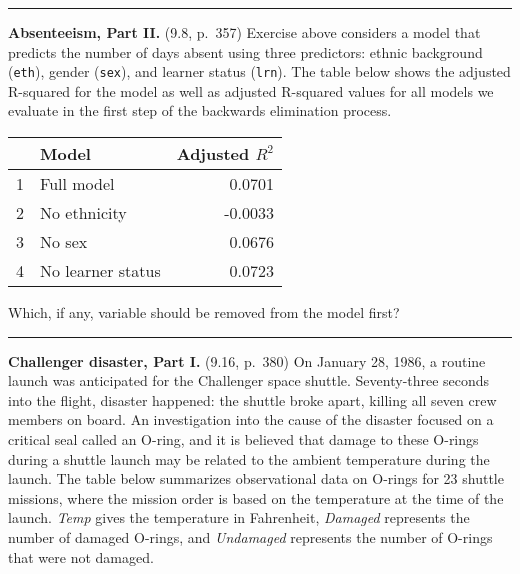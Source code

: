 \documentclass[
]{article}
\begin{document}
\begin{center}\rule{0.5\linewidth}{0.5pt}\end{center}

\clearpage

\textbf{Absenteeism, Part II.} (9.8, p.~357) Exercise above considers a
model that predicts the number of days absent using three predictors:
ethnic background (\texttt{eth}), gender (\texttt{sex}), and learner
status (\texttt{lrn}). The table below shows the adjusted R-squared for
the model as well as adjusted R-squared values for all models we
evaluate in the first step of the backwards elimination process.

\begin{center}
\begin{tabular}{rlr}
  \hline
  & Model               & Adjusted $R^2$ \\ 
  \hline
1 & Full model          & 0.0701 \\ 
2 & No ethnicity        & -0.0033 \\ 
3 & No sex              & 0.0676 \\ 
4 & No learner status   & 0.0723 \\ 
  \hline
\end{tabular}
\end{center}

Which, if any, variable should be removed from the model first?

\begin{center}\rule{0.5\linewidth}{0.5pt}\end{center}

\clearpage

\textbf{Challenger disaster, Part I.} (9.16, p.~380) On January 28,
1986, a routine launch was anticipated for the Challenger space shuttle.
Seventy-three seconds into the flight, disaster happened: the shuttle
broke apart, killing all seven crew members on board. An investigation
into the cause of the disaster focused on a critical seal called an
O-ring, and it is believed that damage to these O-rings during a shuttle
launch may be related to the ambient temperature during the launch. The
table below summarizes observational data on O-rings for 23 shuttle
missions, where the mission order is based on the temperature at the
time of the launch. \emph{Temp} gives the temperature in Fahrenheit,
\emph{Damaged} represents the number of damaged O-rings, and
\emph{Undamaged} represents the number of O-rings that were not damaged.
\end{document}

